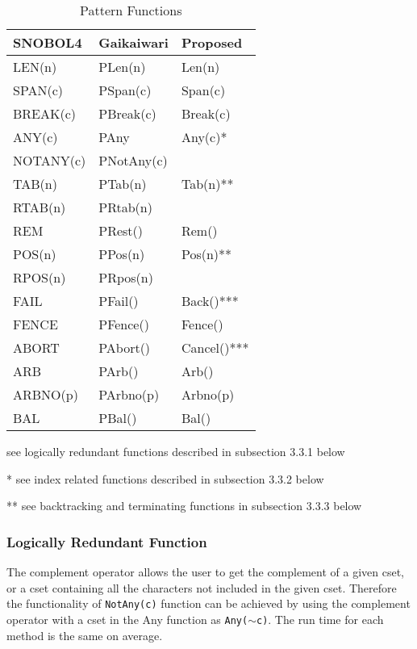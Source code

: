 \documentclass{article}
\begin{document}
\begin{table}[ht]
	\begin{threeparttable}
		\caption{Pattern Functions}
		\centering
		
		\begin{tabular}{|l|l|l|}
			\hline\hline
			SNOBOL4 & Gaikaiwari & Proposed \\
			\hline
			LEN(n) & PLen(n) & Len(n) \\
			SPAN(c) & PSpan(c) & Span(c)  \\
			BREAK(c) & PBreak(c) & Break(c) \\
			ANY(c) & PAny & Any(c)* \\
			NOTANY(c) & PNotAny(c) &  \\
			TAB(n) & PTab(n) & Tab(n)** \\
			RTAB(n) & PRtab(n) &  \\
			REM & PRest() & Rem() \\
			POS(n) & PPos(n) & Pos(n)**  \\
			RPOS(n) & PRpos(n) &  \\
			FAIL & PFail() & Back()*** \\
			FENCE & PFence() & Fence() \\
			ABORT & PAbort() & Cancel()*** \\
			ARB & PArb() & Arb() \\
			ARBNO(p) & PArbno(p) & Arbno(p) \\
			BAL & PBal() & Bal() \\
			\hline
		\end{tabular}
		
		\begin{tablenotes}
      		\small
      		\item * see logically redundant functions described in subsection 3.3.1 below
      		\item ** see index related functions described in subsection 3.3.2 below
      		\item *** see backtracking and terminating functions in subsection 3.3.3 below
      	\end{tablenotes}
	\end{threeparttable}
\end{table}


\vspace{1 pc}
\subsubsection{Logically Redundant Function}
The complement operator allows the user to get the complement of a given cset, or a cset containing all the characters not included in the given cset.  Therefore the functionality of \texttt{NotAny(c)} function can be achieved by using the complement operator with a cset in the Any function as \texttt{Any($\sim$c)}.  The run time for each method is the same on average.
\end{document}
